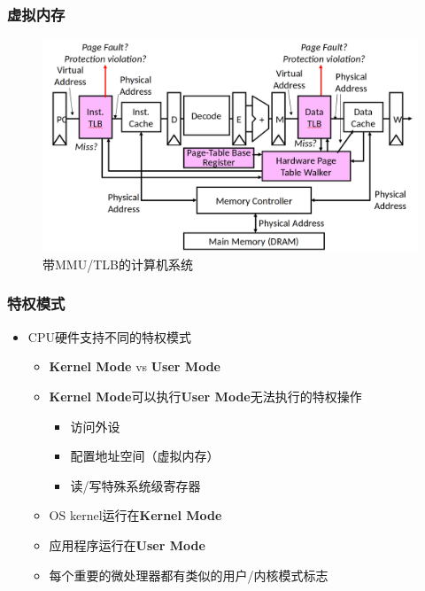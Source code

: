 \documentclass[UTF8]{ctexbeamer}
\begin{document}
\begin{frame}
	
	\frametitle{虚拟内存}
	
	\begin{figure}
		\centering
		\includegraphics[width=0.9\linewidth]{arch-with-tlb-mmu}
		\caption{带MMU/TLB的计算机系统}
	\end{figure}
	
\end{frame}


\begin{frame}
	\frametitle{特权模式}
	\begin{itemize}
		\item CPU硬件支持不同的特权模式
		\begin{itemize}
			\item \textbf{Kernel Mode} vs \textbf{User Mode}
			\item \textbf{Kernel Mode}可以执行\textbf{User Mode}无法执行的特权操作
			\begin{itemize}
				\item 访问外设
				\item 配置地址空间（虚拟内存）
				\item 读/写特殊系统级寄存器
			\end{itemize}			
			
			\item OS kernel运行在\textbf{Kernel Mode} 
			\item 应用程序运行在\textbf{User Mode}
			\item 每个重要的微处理器都有类似的用户/内核模式标志
				
		\end{itemize}
	\end{itemize}
\end{frame}
\end{document}

